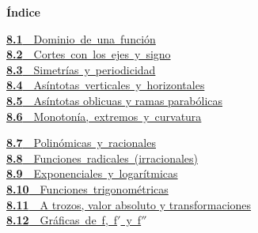 \documentclass[11pt,a4paper]{article}
\begin{document}
\begin{tcolorbox}[colback=fmsurface,colframe=fmsurface,arc=3mm,left=4mm,right=4mm,top=2mm,bottom=2mm]
\small\textbf{Índice}\par\smallskip
\begin{minipage}[t]{0.49\linewidth}\small \mbox{\hyperlink{sec1}{\textbf{\color{fmgreen}8.1}\ \ Dominio de una función}}\\[3pt]
\mbox{\hyperlink{sec2}{\textbf{\color{fmgreen}8.2}\ \ Cortes con los ejes y signo}}\\[3pt]
\mbox{\hyperlink{sec3}{\textbf{\color{fmgreen}8.3}\ \ Simetrías y periodicidad}}\\[3pt]
\mbox{\hyperlink{sec4}{\textbf{\color{fmgreen}8.4}\ \ Asíntotas verticales y horizontales}}\\[3pt]
\hyperlink{sec5}{\textbf{\color{fmgreen}8.5}\ \ Asíntotas oblicuas y ramas parabólicas}\\[3pt]
\mbox{\hyperlink{sec6}{\textbf{\color{fmgreen}8.6}\ \ Monotonía, extremos y curvatura}}\\[3pt]\end{minipage}\hfill\begin{minipage}[t]{0.49\linewidth}\small \mbox{\hyperlink{sec7}{\textbf{\color{fmgreen}8.7}\ \ Polinómicas y racionales}}\\[3pt]
\mbox{\hyperlink{sec8}{\textbf{\color{fmgreen}8.8}\ \ Funciones radicales (irracionales)}}\\[3pt]
\mbox{\hyperlink{sec9}{\textbf{\color{fmgreen}8.9}\ \ Exponenciales y logarítmicas}}\\[3pt]
\mbox{\hyperlink{sec10}{\textbf{\color{fmgreen}8.10}\ \ Funciones trigonométricas}}\\[3pt]
\hyperlink{sec11}{\textbf{\color{fmgreen}8.11}\ \ A trozos, valor absoluto y transformaciones}\\[3pt]
\mbox{\hyperlink{sec12}{\textbf{\color{fmgreen}8.12}\ \ Gráficas de f, f$'$ y f$''$}}\\[3pt]\end{minipage}
\end{tcolorbox}
\vspace*{0.3cm}
\end{document}
